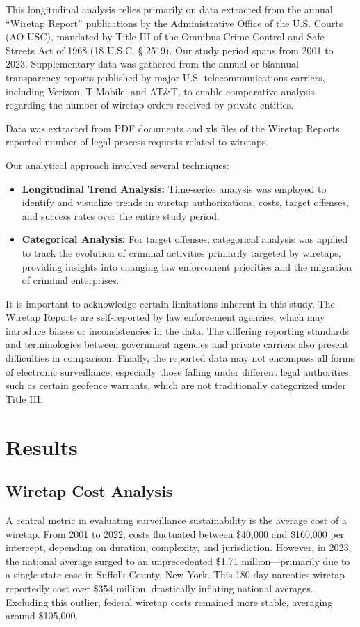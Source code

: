 \documentclass[11pt,twocolumn]{article} %
\begin{document}
\noindent This longitudinal analysis relies primarily on data extracted from the annual ``Wiretap Report'' publications by the Administrative Office of the U.S. Courts (AO-USC), mandated by Title III of the Omnibus Crime Control and Safe Streets Act of 1968 (18 U.S.C. § 2519). Our study period spans from 2001 to 2023. Supplementary data was gathered from the annual or biannual transparency reports published by major U.S. telecommunications carriers, including Verizon, T-Mobile, and AT\&T, to enable comparative analysis regarding the number of wiretap orders received by private entities.

\noindent Data was  extracted from PDF documents and xls files of the Wiretap Reports. reported number of legal process requests related to wiretaps.

\noindent Our analytical approach involved several techniques:
\begin{itemize}
    \item \textbf{Longitudinal Trend Analysis:} Time-series analysis was employed to identify and visualize trends in wiretap authorizations, costs, target offenses, and success rates over the entire study period.
    
    \item \textbf{Categorical Analysis:} For target offenses, categorical analysis was applied to track the evolution of criminal activities primarily targeted by wiretaps, providing insights into changing law enforcement priorities and the migration of criminal enterprises.
\end{itemize}

\noindent It is important to acknowledge certain limitations inherent in this study. The Wiretap Reports are self-reported by law enforcement agencies, which may introduce biases or inconsistencies in the data. The differing reporting standards and terminologies between government agencies and private carriers also present difficulties in comparison. Finally, the reported data may not encompass all forms of electronic surveillance, especially those falling under different legal authorities, such as certain geofence warrants, which are not traditionally categorized under Title III.

\section{Results}

\subsection{Wiretap Cost Analysis}
A central metric in evaluating surveillance sustainability is the average cost of a wiretap. From 2001 to 2022, costs fluctuated between \$40,000 and \$160,000 per intercept, depending on duration, complexity, and jurisdiction. However, in 2023, the national average surged to an unprecedented \$1.71 million—primarily due to a single state case in Suffolk County, New York. This 180-day narcotics wiretap reportedly cost over \$354 million, drastically inflating national averages. Excluding this outlier, federal wiretap costs remained more stable, averaging around \$105,000.\\
\end{document}
